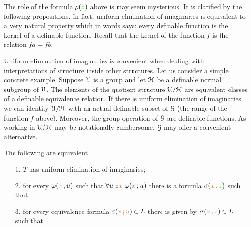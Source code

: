 \documentclass[creche.tex]{subfiles}
\begin{document}

The role of the formula $\rho({\color{green} z})$ above is may seem mysterious. It is clarified by the following propositions. In fact, uniform elimination of imaginaries is equivalent to a very natural property which in words says: every definable function is the kernel of a definable function. Recall that the kernel of the function $f$ is the relation $fa=fb$.

Uniform elimination of imaginaries is convenient when dealing with interpretations of structure inside other structures. Let us consider a simple concrete example. Suppose $\EuScript U$ is a group and let $\EuScript H$ be a definable normal subgroup of $\EuScript U$. The elements of the quotient structure $\EuScript U/\EuScript H$ are equivalent classes of a definable equivalence relation. If there is uniform elimination of imaginaries we can identify $\EuScript U/\EuScript H$ with an actual definable subset of $\EuScript G$ (the range of the function $f$ above). Moreover, the group operation of $\EuScript G$ are definable functions. As working in $\EuScript U/\EuScript H$ may be notationally cumbersome, $\EuScript G$ may offer a convenient alternative.

\begin{proposition}\label{prop_uei_standard}
The following are equivalent
\begin{itemize}
\item[1.] $T$ has uniform elimination of imaginaries;
\end{itemize}
\begin{itemize}
\item[2.] for every $\varphi({\color{brown} x}\,;u)$ such that  $\forall u\;\exists{\color{brown}x}\;\varphi({\color{brown} x}\,;u)$ there is a formula $\sigma({\color{brown} x}\,;{\color{green} z})$ such that 
\end{itemize}


\begin{itemize}
\item[3.] for every equivalence formula $\varepsilon({\color{brown} x}\,;{\color{brown} u})\in L$ there is given by $\sigma({\color{brown} x}\,;{\color{green} z})\in L$ such that
\end{itemize}



\end{proposition}
\end{document}
